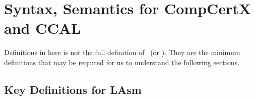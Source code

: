 \section{Syntax, Semantics for CompCertX and CCAL}

Definitions in here is not the full definition of \compcertx \ (or \compcertkwd). 
They are the minimum definitions that may be required for us to understand the following sections. 


\subsection{Key Definitions for LAsm}
\label{subsec:key-def-for-lasm}

\newcommand{\listlengthkwd}{{\mathrm{len_{lst}}}}

\newcommand{\listlengthnoeq}[1]{{\listlengthkwd({#1})}}
\newcommand{\listlength}[2]{{\listlengthnoeq{#1} = {#2}}}


\newcommand{\ccbyte}{{\mathrm{\texttt{byte}}}}
\newcommand{\ccbytes}{{\listconstructor{\ccbyte}}}
\newcommand{\ccmem}{{\mathrm{\texttt{mem}}}}
\newcommand{\ccprivatemem}{{\ccmem}_{\mathrm{\texttt{p}}}}
\newcommand{\ccsharedmem}{{\ccmem}_{\mathrm{\texttt{s}}}}
%
%


\newcommand{\ccval}{{\mathrm{\texttt{val}}}}
\newcommand{\ccvalintkwd}[1]{{\mathrm{\texttt{Vint}~{#1}}}}
\newcommand{\ccintval}{{\mathrm{\texttt{val}}_{\mathrm{\texttt{int}}}}}
\newcommand{\ccvalptrkwd}[2]{{\mathrm{\texttt{Vptr}~{#1}~{#2}}}}

\newcommand{\ccvundef}{{\mathrm{\texttt{Vundef}}}}
\newcommand{\ccvint}[1]{{\mathrm{\texttt{Vint}}~{#1}}}
\newcommand{\cpuident}{{\mathrm{ID}_\mathrm{cpu}}}


\newcommand{\ccregisterpc}{{\mathrm{\texttt{PC}}}}
\newcommand{\ccregisterebx}{{\mathrm{\texttt{EBX}}}}
\newcommand{\ccregistereax}{{\mathrm{\texttt{EAX}}}}
\newcommand{\ccregister}{{\mathrm{\texttt{reg}}}}

\newcommand{\ccregisterset}{{\rho}}

\newcommand{\absstatekwd}{{\mathrm{\texttt{a}}}}
\newcommand{\ccprivateabsstate}{{\absstatekwd_{\mathrm{\texttt{p}}}}}
\newcommand{\ccsharedabsstate}{{\absstatekwd_{\mathrm{\texttt{s}}}}}
\newcommand{\ccmemloc}{{\mathrm{\texttt{loc}}}}
\newcommand{\ccmemvallength}{{\mathrm{\texttt{vlen}}}}


